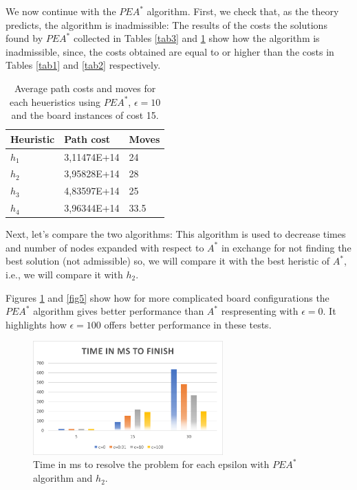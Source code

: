 \documentclass[runningheads]{llncs}
\begin{document}
We now continue with the $PEA^*$ algorithm.
First, we check that, as the theory predicts, the algorithm is inadmissible:
The results of the costs the solutions found by $PEA^*$ collected in Tables \ref{tab3} and \ref{tab4} show how the algorithm is inadmissible, since,
the costs obtained are equal to or higher than the costs in Tables \ref{tab1} and \ref{tab2} respectively.
\begin{table}
\centering
\caption{Average path costs and moves for each heueristics using $PEA^*$, $\epsilon=10$ and the board instances of cost 15.}\label{tab4}
\begin{tabular}{|l|l|l|}
\hline
Heuristic & Path cost & Moves\\
\hline
$h_1$ & 3,11474E+14    & 24\\
$h_2$ & 3,95828E+14    & 28\\
$h_3$ & 4,83597E+14    & 25\\
$h_4$ & 3,96344E+14    & 33.5\\
\hline
\end{tabular}
\end{table}

Next, let's compare the two algorithms:
This algorithm is used to decrease times and number of nodes expanded
with respect to $A^*$ in exchange for not finding the best solution (not admissible) so, we will compare it with the best heristic of $A^*$, i.e., we will compare it with $h_2$.

Figures \ref{fig4} and \ref{fig5} show how for more complicated board configurations the $PEA^*$ algorithm gives better performance than $A^*$ respresenting with $\epsilon=0$.
It highlights how $\epsilon=100$ offers better performance in these tests.

\begin{figure}
    \centering
    \includegraphics[width=0.65\textwidth]{time_AvsPEA.png}
    \caption{Time in ms to resolve the problem for each epsilon with $PEA^*$ algorithm and $h_2$.} \label{fig4}
\end{figure}
\end{document}
